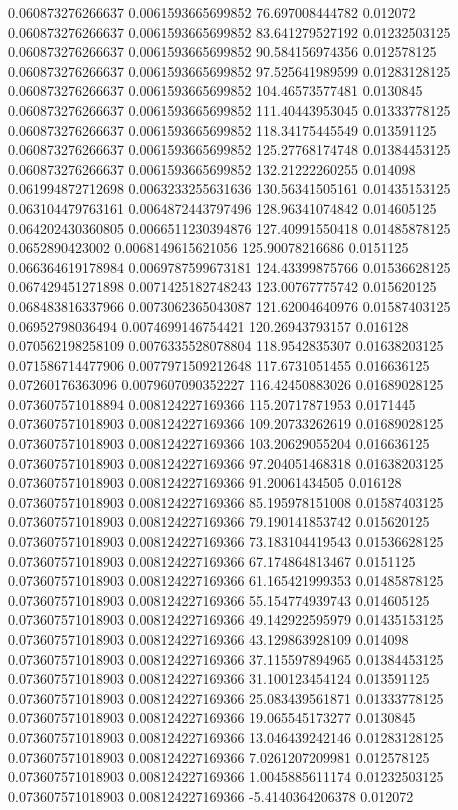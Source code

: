 0.060873276266637 0.0061593665699852 76.697008444782 0.012072
0.060873276266637 0.0061593665699852 83.641279527192 0.01232503125
0.060873276266637 0.0061593665699852 90.584156974356 0.012578125
0.060873276266637 0.0061593665699852 97.525641989599 0.01283128125
0.060873276266637 0.0061593665699852 104.46573577481 0.0130845
0.060873276266637 0.0061593665699852 111.40443953045 0.01333778125
0.060873276266637 0.0061593665699852 118.34175445549 0.013591125
0.060873276266637 0.0061593665699852 125.27768174748 0.01384453125
0.060873276266637 0.0061593665699852 132.21222260255 0.014098
0.061994872712698 0.0063233255631636 130.56341505161 0.01435153125
0.063104479763161 0.0064872443797496 128.96341074842 0.014605125
0.064202430360805 0.0066511230394876 127.40991550418 0.01485878125
0.0652890423002 0.0068149615621056 125.90078216686 0.0151125
0.066364619178984 0.0069787599673181 124.43399875766 0.01536628125
0.067429451271898 0.0071425182748243 123.00767775742 0.015620125
0.068483816337966 0.0073062365043087 121.62004640976 0.01587403125
0.06952798036494 0.0074699146754421 120.26943793157 0.016128
0.070562198258109 0.0076335528078804 118.9542835307 0.01638203125
0.071586714477906 0.0077971509212648 117.6731051455 0.016636125
0.07260176363096 0.0079607090352227 116.42450883026 0.01689028125
0.073607571018894 0.008124227169366 115.20717871953 0.0171445
0.073607571018903 0.008124227169366 109.20733262619 0.01689028125
0.073607571018903 0.008124227169366 103.20629055204 0.016636125
0.073607571018903 0.008124227169366 97.204051468318 0.01638203125
0.073607571018903 0.008124227169366 91.20061434505 0.016128
0.073607571018903 0.008124227169366 85.195978151008 0.01587403125
0.073607571018903 0.008124227169366 79.190141853742 0.015620125
0.073607571018903 0.008124227169366 73.183104419543 0.01536628125
0.073607571018903 0.008124227169366 67.174864813467 0.0151125
0.073607571018903 0.008124227169366 61.165421999353 0.01485878125
0.073607571018903 0.008124227169366 55.154774939743 0.014605125
0.073607571018903 0.008124227169366 49.142922595979 0.01435153125
0.073607571018903 0.008124227169366 43.129863928109 0.014098
0.073607571018903 0.008124227169366 37.115597894965 0.01384453125
0.073607571018903 0.008124227169366 31.100123454124 0.013591125
0.073607571018903 0.008124227169366 25.083439561871 0.01333778125
0.073607571018903 0.008124227169366 19.065545173277 0.0130845
0.073607571018903 0.008124227169366 13.046439242146 0.01283128125
0.073607571018903 0.008124227169366 7.0261207209981 0.012578125
0.073607571018903 0.008124227169366 1.0045885611174 0.01232503125
0.073607571018903 0.008124227169366 -5.4140364206378 0.012072

